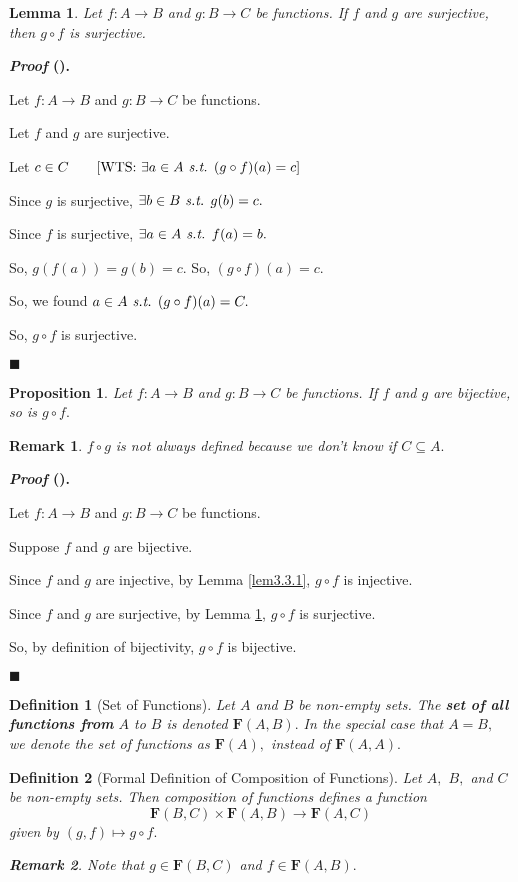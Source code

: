 \documentclass[12pt,a4paper]{article}
\newtheorem{df}{Definition}[subsection]
\newtheorem{prop}{Proposition}[section]
\newtheorem{lem}{Lemma}[section]
\newcounter{nprf}[subsection]
\newtheorem*{rmk}{\indent Remark}
\newenvironment*{prf}{\par\indent\textbf{\textit{Proof} (\stepcounter{nprf}\thenprf). }\par }{\par\hfill $\blacksquare$\par}
\def\of{\circ}
\def\F{\mathbf{F}}
\def\st{\emph{ s.t. }}
\begin{document}
\begin{framed}
\begin{lem}\label{lem3.3.2}
	Let $f:A\to B$ and $g: B\to C$ be functions. If $f$ and $g$ are surjective, then $g\of f$ is surjective. 
\end{lem}
\begin{prf}
	Let $f:A\to B$ and $g:B\to C$ be functions.\par Let $f$ and $g$ are surjective.\par Let $c\in C\qquad[\text{WTS: }\exists a\in A\st(g\of f)(a)=c]$\par Since $g$ is surjective, $\exists b\in B\st g(b)=c.$\par Since $f$ is surjective, $\exists a\in A\st f(a)=b.$\par So, $g(f(a))=g(b)=c.$ So, $(g\of f)(a)=c.$\par So, we found $a\in A\st(g\of f)(a)=C.$\par So, $g\of f$ is surjective.
\end{prf}
\end{framed}
\begin{framed}
\begin{prop}
	Let $f:A\to B$ and $g: B\to C$ be functions. If $f$ and $g$ are bijective, so is $g\of f.$
\end{prop}
	\begin{rmk}
		$f\of g$ is not always defined because we don't know if $C\subseteq A.$
	\end{rmk}
\begin{prf}
	Let $f:A\to B$ and $g:B\to C$ be functions.\par Suppose $f$ and $g$ are bijective.\par Since $f$ and $g$ are injective, by Lemma \ref{lem3.3.1}, $g\of f$ is injective.\par Since $f$ and $g$ are surjective, by Lemma \ref{lem3.3.2}, $g\of f$ is surjective.\par So, by definition of bijectivity, $g\of f$ is bijective. 
\end{prf}
\end{framed}
\begin{df}[Set of Functions]
	Let $A$ and $B$ be non-empty sets. The \textbf{set of all functions from} $A$ to $B$ is denoted $\F(A,B).$ In the special case that $A=B,$ we denote the set of functions as $\F(A),$ instead of $\F(A,A).$
\end{df}
\begin{df}[Formal Definition of Composition of Functions]
	Let $A,$ $B,$ and $C$ be non-empty sets. Then composition of functions defines a function \[\F(B,C)\times\F(A,B)\to\F(A,C)\] given by $(g,f)\mapsto g\of f.$
	\begin{rmk}
		Note that $g\in\F(B,C)$ and $f\in\F(A,B).$
	\end{rmk}	
\end{df}
\end{document}
